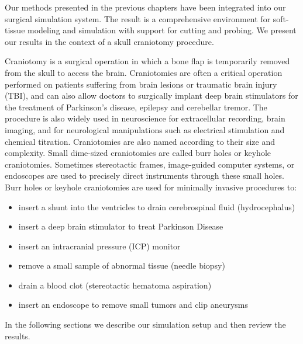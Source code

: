 \label{chapter:evaluation}
Our methods presented in the previous chapters have been integrated into our surgical simulation system. 
The result is a comprehensive environment for soft-tissue modeling and simulation with support for cutting and
probing. We present our results in the context of a skull craniotomy procedure.

Craniotomy is a surgical operation in which a bone flap is temporarily removed 
from the skull to access the brain. Craniotomies are often a critical operation performed on patients suffering 
from brain lesions or traumatic brain injury (TBI), and can also allow doctors to surgically implant deep brain 
stimulators for the treatment of Parkinson's disease, epilepsy and cerebellar tremor. The procedure is also widely 
used in neuroscience for extracellular recording, brain imaging, and for neurological manipulations such as electrical 
stimulation and chemical titration. Craniotomies are also named according to their size and complexity. Small dime-sized 
craniotomies are called burr holes or keyhole craniotomies. Sometimes stereotactic frames, image-guided computer systems, 
or endoscopes are used to precisely direct instruments through these small holes. Burr holes or keyhole craniotomies are 
used for minimally invasive procedures to:

\begin{itemize}
 \item insert a shunt into the ventricles to drain cerebrospinal fluid (hydrocephalus)
 \item insert a deep brain stimulator to treat Parkinson Disease
 \item insert an intracranial pressure (ICP) monitor
 \item remove a small sample of abnormal tissue (needle biopsy)
 \item drain a blood clot (stereotactic hematoma aspiration)
 \item insert an endoscope to remove small tumors and clip aneurysms
\end{itemize}

In the following sections we describe our simulation setup and then review the results. 

